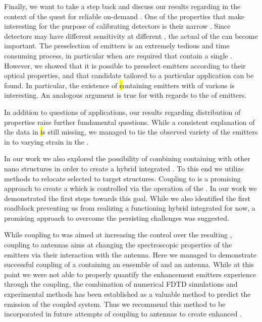 
   Finally, we want to take a step back and discuss our results regarding \sivs in the context of the quest for reliable on-demand \spss. One of the properties that make \sivs interesting \spss for the purpose of calibrating detectors is their narrow \lw \zpl. Since detectors may have different sensitivity at different \wls, the actual \wl of the \zpl can become important. 
   The preselection of emitters is an extremely tedious and time consuming process, in particular when \nds are required that contain a single \siv. However, we showed that it is possible to preselect emitters according to their optical properties, and that candidate \nds tailored to a particular application can be found. In particular, the existence of \hl containing emitters with \zpls of various \wls is interesting. An analogous argument is true for \vl with regards to the \cwl of emitters.

   In addition to questions of applications, our results regarding distribution of \siv properties raise further fundamental questions. While a consistent explanation of the data in \hl is still missing, we managed to tie the observed variety of the emitters in \vl to varying strain in the \nds.

   In our work we also explored the possibility of combining \nds containing \sivs with other nano structures in order to create a hybrid integrated \sps. To this end we utilize \pp methods to relocate selected \nds to target structures. Coupling \nds to \VCSELs is a promising approach to create a \sps which is controlled via the operation of the \VCSELs. In our work we demonstrated the first steps towards this goal. While we also identified the first roadblock preventing us from realizing a functioning hybrid integrated \sps for now, a promising approach to overcome the persisting challenges was suggested.

   While coupling \sivs to \VCSELs was aimed at increasing the control over the resulting \sps, coupling to antennas aims at changing the spectroscopic properties of the emitters via their interaction with the antenna. Here we managed to demonstrate successful coupling of a \nd containing an ensemble of \sivs and an antenna. While at this point we were not able to properly quantify the enhancement emitters experience through the coupling, the combination of numerical FDTD simulations and experimental methods has been established as a valuable method to predict the emission of the coupled system. Thus we recommend this method to be incorporated in future attempts of coupling \sivs to antennas to create enhanced \spss.


